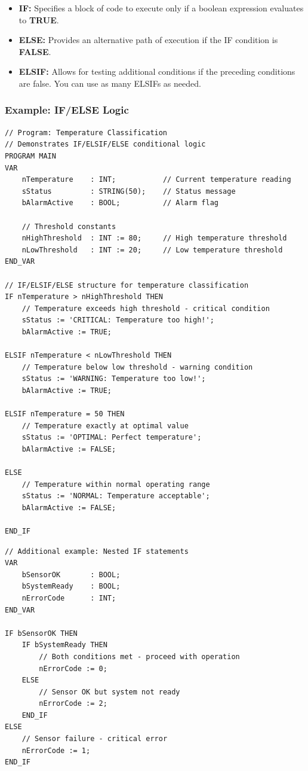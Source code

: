 \documentclass[11pt,a4paper]{article}
\begin{document}
\begin{itemize}[leftmargin=*]
    \item \textbf{IF:} Specifies a block of code to execute only if a boolean expression evaluates to \textbf{TRUE}.
    
    \item \textbf{ELSE:} Provides an alternative path of execution if the IF condition is \textbf{FALSE}.
    
    \item \textbf{ELSIF:} Allows for testing additional conditions if the preceding conditions are false. You can use as many ELSIFs as needed.
\end{itemize}

\subsubsection*{Example: IF/ELSE Logic}

\begin{lstlisting}
// Program: Temperature Classification
// Demonstrates IF/ELSIF/ELSE conditional logic
PROGRAM MAIN
VAR
    nTemperature    : INT;           // Current temperature reading
    sStatus         : STRING(50);    // Status message
    bAlarmActive    : BOOL;          // Alarm flag
    
    // Threshold constants
    nHighThreshold  : INT := 80;     // High temperature threshold
    nLowThreshold   : INT := 20;     // Low temperature threshold
END_VAR

// IF/ELSIF/ELSE structure for temperature classification
IF nTemperature > nHighThreshold THEN
    // Temperature exceeds high threshold - critical condition
    sStatus := 'CRITICAL: Temperature too high!';
    bAlarmActive := TRUE;
    
ELSIF nTemperature < nLowThreshold THEN
    // Temperature below low threshold - warning condition
    sStatus := 'WARNING: Temperature too low!';
    bAlarmActive := TRUE;
    
ELSIF nTemperature = 50 THEN
    // Temperature exactly at optimal value
    sStatus := 'OPTIMAL: Perfect temperature';
    bAlarmActive := FALSE;
    
ELSE
    // Temperature within normal operating range
    sStatus := 'NORMAL: Temperature acceptable';
    bAlarmActive := FALSE;
    
END_IF
\end{lstlisting}

\begin{lstlisting}
// Additional example: Nested IF statements
VAR
    bSensorOK       : BOOL;
    bSystemReady    : BOOL;
    nErrorCode      : INT;
END_VAR

IF bSensorOK THEN
    IF bSystemReady THEN
        // Both conditions met - proceed with operation
        nErrorCode := 0;
    ELSE
        // Sensor OK but system not ready
        nErrorCode := 2;
    END_IF
ELSE
    // Sensor failure - critical error
    nErrorCode := 1;
END_IF
\end{lstlisting}
\end{document}
